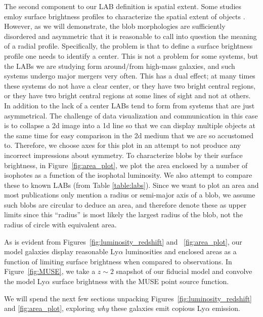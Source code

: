 The second component to our LAB definition is spatial extent.
Some studies emloy surface brightness profiles to characterize the spatial extent of objects \citep[e.g.][]{Wisotzki2018, Steidel2011}.
However, as we will demonstrate, the blob morphologies are sufficiently disordered and asymmetric that it is reasonable to call into question the meaning of a radial profile.
Specifically, the problem is that to define a surface brightness profile one needs to identify a center.
This is not a problem for some systems, but the LABs we are studying form around/from high-mass galaxies, and such systems undergo major mergers very often.
This has a dual effect; at many times these systems do not have a clear center, or they have two bright central regions, or they have two bright central regions at some lines of sight and not at others.
In addition to the lack of a center LABs tend to form from systems that are just asymmetrical.
The challenge of data visualization and communication in this case is to collapse a 2d image into a 1d line so that we can display multiple objects at the same time for easy comparison in the 2d medium that we are so accustomed to.
Therefore, we choose axes for this plot in an attempt to not produce any incorrect impressions about symmetry.
To characterize blobs by their surface brightness, in Figure~\ref{fig:area_plot}, we plot the area enclosed by a number of isophotes as a function of the isophotal luminosity.
We also attempt to compare these to known LABs (from Table \ref{table:labs}).
Since we want to plot an area and most publications only mention a radius or semi-major axis of a blob, we assume such blobs are circular to deduce an area, and therefore denote these as upper limits since this ``radius'' is most likely the largest radius of the blob, not the radius of circle with equivalent area.

As is evident from Figures~\ref{fig:luminosity_redshift} and ~\ref{fig:area_plot}, our model galaxies display reasonable Ly$\alpha$ luminosities and enclosed areas as a function of limiting surface brightness when compared to observations.
In Figure~\ref{fig:MUSE}, we take a $z \sim 2$ snapshot of our fiducial model and convolve the model Ly$\alpha$ surface brightness with the MUSE point source function.

We will spend the next few sections unpacking Figures~\ref{fig:luminosity_redshift} and \ref{fig:area_plot}, exploring {\it why} these galaxies emit copious Ly$\alpha$ emission.

